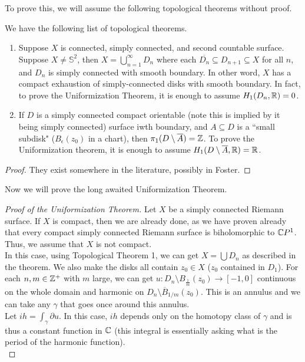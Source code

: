 \documentclass{article}
\begin{document}
{To prove this, we will assume the following topological theorems without proof.
\begin{theorem}
We have the following list of topological theorems.
\begin{enumerate}
    \item Suppose $X$ is connected, simply connected, and second countable surface. Suppose $X \neq \mathbb{S}^2$, then $X = \bigcup_{n = 1}^\infty D_n$ where each $\overline{D_n} \subseteq D_{n+1} \subseteq X$ for all $n$, and $D_n$ is simply connected with smooth boundary. In other word, $X$ has a compact exhaustion of simply-connected disks with smooth boundary. In fact, to prove the Uniformization Theorem, it is enough to assume $H_1(D_n, \mathbb{R}) = 0$.
    \item If $D$ is a simply connected compact orientable (note this is implied by it being simply connected) surface iwth boundary, and $A \subseteq D$ is a ``small subdisk" ($B_\epsilon(z_0)$ in a chart), then $\pi_1(D \setminus \overline{A}) = \mathbb{Z}$. To prove the Uniformization theorem, it is enough to assume $H_1(D \setminus \overline{A}, \mathbb{R}) = \mathbb{R}$.
\end{enumerate}
\end{theorem}

\begin{proof}
    They exist somewhere in the literature, possibly in Foster.
\end{proof}

Now we will prove the long awaited Uniformization Theorem.
\begin{proof}[Proof of the Uniformization Theorem]
 Let $X$ be a simply connected Riemann surface. If $X$ is compact, then we are already done, as we have proven already that every compact simply connected Riemann surface is biholomorphic to $\mathbb{C} P^1$. Thus, we assume that $X$ is not compact.\\

 In this case, using Topological Theorem 1, we can get $X = \bigcup D_n$ as described in the theorem. We also make the disks all contain $z_0 \in X$ ($z_0$ contained in $D_1$). For each $n, m \in \mathbb{Z}^+$ with $m$ large, we can get $u: D_n \setminus B_{\frac{1}{m}}(z_0) \to [-1, 0]$ continuous on the whole domain and harmonic on $D_n \setminus \overline{B}_{1/m}(z_0)$. This is an annulus and we can take any $\gamma$ that goes once around this annulus.\\

 Let $ih = \int_{\gamma} \partial u$. In this case, $ih$ depends only on the homotopy class of $\gamma$ and is thus a constant function in $\mathbb{C}$ (this integral is essentially asking what is the period of the harmonic function).\\


\end{proof}}
\end{document}
